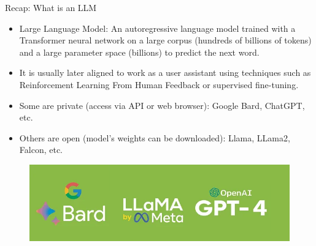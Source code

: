 \documentclass[handout]{beamer}
\begin{document}
\begin{frame}{Recap: What is an LLM}
\begin{scriptsize}
\begin{itemize}
\item  Large Language Model: An autoregressive language model trained with a Transformer neural network on a large corpus (hundreds of billions of tokens) and a large parameter space (billions) to predict the next word.
\item It is usually later aligned to work as a user assistant using techniques such as Reinforcement Learning From Human Feedback  \cite{ouyang2022training} or supervised fine-tuning.
\item Some are private (access via API or web browser): Google Bard, ChatGPT, etc.
\item Others are open (model's weights can be downloaded): Llama, LLama2, Falcon, etc.
\end{itemize}

 \begin{figure}[h]
        	\includegraphics[scale = 0.4]{pics/gptllama.png}
        \end{figure}

\end{scriptsize}
\end{frame}
\end{document}
